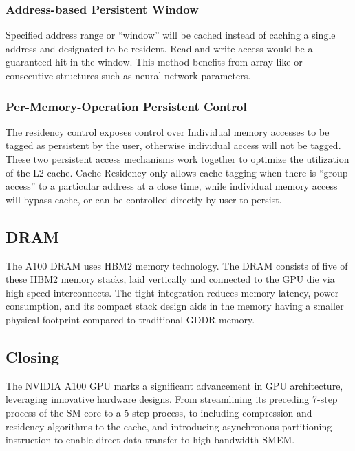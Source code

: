\subsubsection{Address-based Persistent Window} Specified address range or “window” will be cached instead of caching a single address and designated to be resident.
Read and write access would be a guaranteed hit in the window.
This method benefits from array-like or consecutive structures such as neural network parameters.

\subsubsection{Per-Memory-Operation Persistent Control} The residency control exposes control over Individual memory accesses to be tagged as persistent by the user, otherwise individual access will not be tagged.
These two persistent access mechanisms work together to optimize the utilization of the L2 cache.
Cache Residency only allows cache tagging when there is ``group access'' to a particular address at a close time, while individual memory access will bypass cache, or can be controlled directly by user to persist.

\subsection{DRAM}
\label{subsec:dram}
The A100 DRAM uses HBM2 memory technology.
The DRAM consists of five of these HBM2 memory stacks, laid vertically and connected to the GPU die via high-speed interconnects.
The tight integration reduces memory latency, power consumption, and its compact stack design aids in the memory having a smaller physical footprint compared to traditional GDDR memory.

\subsection{Closing}
\label{subsec:closing}
The NVIDIA A100 GPU marks a significant advancement in GPU architecture, leveraging innovative hardware designs.
From streamlining its preceding 7-step process of the SM core to a 5-step process, to including compression and residency algorithms to the cache, and introducing asynchronous partitioning instruction to enable direct data transfer to high-bandwidth SMEM\@.